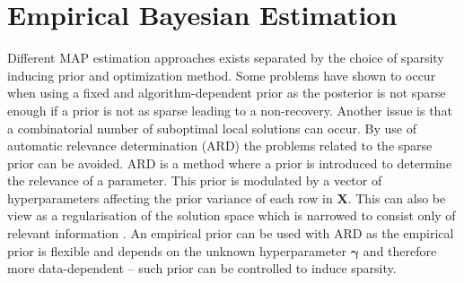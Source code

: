 \section{Empirical Bayesian Estimation}
Different MAP estimation approaches exists separated by the choice of sparsity inducing prior and optimization method. 
Some problems have shown to occur when using a fixed and algorithm-dependent prior as the posterior is not sparse enough if a prior is not as sparse leading to a non-recovery. 
Another issue is that a combinatorial number of suboptimal local solutions can occur.  
By use of automatic relevance determination (ARD) the problems related to the sparse prior can be avoided. 
ARD is a method where a prior is introduced to determine the relevance of a parameter. 
This prior is modulated by a vector of hyperparameters affecting the prior variance of each row in $\mathbf{X}$.
This can also be view as a regularisation of the solution space which is narrowed to consist only of relevant information \cite{ARD}.
An empirical prior can be used with ARD as the empirical prior is flexible and depends on the unknown hyperparameter $\boldsymbol{\gamma}$ and therefore more data-dependent -- such prior can be controlled to induce sparsity.

